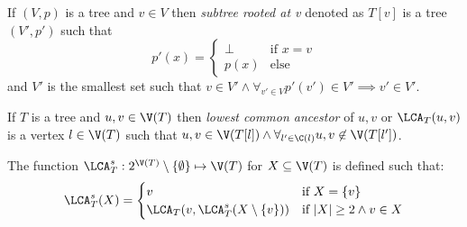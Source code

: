 \begin{defi}
    If $(V,p)$ is a tree and $v \in V$ then \emph{subtree rooted at v} denoted as $T[v]$ is a tree $(V', p')$ such that
    \[
        p'(x) = \begin{cases}
            \bot & \text{if } x = v \\
            p(x) & \text{else}
        \end{cases}
    \]
    and $V'$ is the smallest set such that $v \in V' \land \forall_{v' \in V} p'(v') \in V' \implies v' \in V'$.
\end{defi}

\begin{defi}
    If $T$ is a tree and $u,v \in \V(T)$ then \emph{lowest common ancestor} of $u, v$ or $\LCA_T(u,v)$ is a vertex $l \in \V(T)$ such that $u,v \in \V(T[l]) \land \forall_{l' \in \C(l)} u,v \not\in \V(T[l'])$.
\end{defi}

\begin{defi}
    The function $\LCA_T^s : 2^{\V(T)} \setminus \{ \emptyset \} \mapsto \V(T)$ for $X \subseteq \V(T)$ is defined such that:
    \[
        \LCA_T^s(X) = \begin{cases}
            v                                      & \text{if } X = \{v\}                \\
            \LCA_T(v, \LCA_T^s(X \setminus \{v\})) & \text{if } |X| \geq 2 \land v \in X \\
        \end{cases}
    \]
\end{defi}
